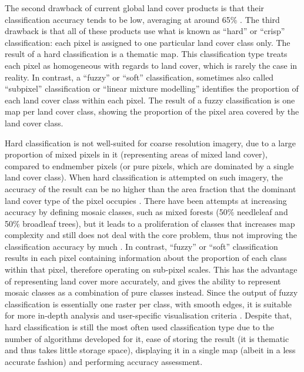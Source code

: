 \documentclass[a4paper,12pt]{scrbook}
\begin{document}
The second drawback of current global land cover products is that their classification accuracy tends to be low, averaging at around 65\% \citep{tsendbazar2016integrating}. The third drawback is that all of these products use what is known as ``hard'' or ``crisp'' classification: each pixel is assigned to one particular land cover class only. The result of a hard classification is a thematic map. This classification type treats each pixel as homogeneous with regards to land cover, which is rarely the case in reality. In contrast, a ``fuzzy'' or ``soft'' classification, sometimes also called ``subpixel'' classification or ``linear mixture modelling'' \citep{Okeke2006fuzzyexponent} identifies the proportion of each land cover class within each pixel. The result of a fuzzy classification is one map per land cover class, showing the proportion of the pixel area covered by the land cover class.

Hard classification is not well-suited for coarse resolution imagery, due to a large proportion of mixed pixels in it (representing areas of mixed land cover), compared to endmember pixels (or pure pixels, which are dominated by a single land cover class). When hard classification is attempted on such imagery, the accuracy of the result can be no higher than the area fraction that the dominant land cover type of the pixel occupies \citep{latifovic2004accuracy}. There have been attempts at increasing accuracy by defining mosaic classes, such as mixed forests (50\% needleleaf and 50\% broadleaf trees), but it leads to a proliferation of classes that increases map complexity and still does not deal with the core problem, thus not improving the classification accuracy by much \citep{tsendbazar2016comparative}. In contrast, ``fuzzy'' or ``soft'' classification results in each pixel containing information about the proportion of each class within that pixel, therefore operating on sub-pixel scales. This has the advantage of representing land cover more accurately, and gives the ability to represent mosaic classes as a combination of pure classes instead. Since the output of fuzzy classification is essentially one raster per class, with smooth edges, it is suitable for more in-depth analysis and user-specific visualisation criteria \citep{tsendbazar2016integrating}. Despite that, hard classification is still the most often used classification type due to the number of algorithms developed for it, ease of storing the result (it is thematic and thus takes little storage space), displaying it in a single map (albeit in a less accurate fashion) and performing accuracy assessment.
\end{document}
